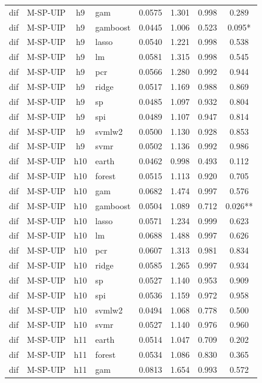 \begin{ThreePartTable}
\begin{longtable}[t]{llclcccc}
dif & M-SP-UIP & h9 & gam & 0.0575 & 1.301 & 0.998 & 0.289\\
dif & M-SP-UIP & h9 & gamboost & 0.0445 & 1.006 & 0.523 & 0.095*\\
dif & M-SP-UIP & h9 & lasso & 0.0540 & 1.221 & 0.998 & 0.538\\
dif & M-SP-UIP & h9 & lm & 0.0581 & 1.315 & 0.998 & 0.545\\
dif & M-SP-UIP & h9 & pcr & 0.0566 & 1.280 & 0.992 & 0.944\\
dif & M-SP-UIP & h9 & ridge & 0.0517 & 1.169 & 0.988 & 0.869\\
dif & M-SP-UIP & h9 & sp & 0.0485 & 1.097 & 0.932 & 0.804\\
dif & M-SP-UIP & h9 & spi & 0.0489 & 1.107 & 0.947 & 0.814\\
dif & M-SP-UIP & h9 & svmlw2 & 0.0500 & 1.130 & 0.928 & 0.853\\
dif & M-SP-UIP & h9 & svmr & 0.0502 & 1.136 & 0.992 & 0.986\\
\addlinespace
dif & M-SP-UIP & h10 & earth & 0.0462 & 0.998 & 0.493 & 0.112\\
dif & M-SP-UIP & h10 & forest & 0.0515 & 1.113 & 0.920 & 0.705\\
dif & M-SP-UIP & h10 & gam & 0.0682 & 1.474 & 0.997 & 0.576\\
dif & M-SP-UIP & h10 & gamboost & 0.0504 & 1.089 & 0.712 & 0.026**\\
dif & M-SP-UIP & h10 & lasso & 0.0571 & 1.234 & 0.999 & 0.623\\
dif & M-SP-UIP & h10 & lm & 0.0688 & 1.488 & 0.997 & 0.626\\
dif & M-SP-UIP & h10 & pcr & 0.0607 & 1.313 & 0.981 & 0.834\\
dif & M-SP-UIP & h10 & ridge & 0.0585 & 1.265 & 0.997 & 0.934\\
dif & M-SP-UIP & h10 & sp & 0.0527 & 1.140 & 0.953 & 0.909\\
dif & M-SP-UIP & h10 & spi & 0.0536 & 1.159 & 0.972 & 0.958\\
dif & M-SP-UIP & h10 & svmlw2 & 0.0494 & 1.068 & 0.778 & 0.500\\
dif & M-SP-UIP & h10 & svmr & 0.0527 & 1.140 & 0.976 & 0.960\\
\addlinespace
dif & M-SP-UIP & h11 & earth & 0.0514 & 1.047 & 0.709 & 0.202\\
dif & M-SP-UIP & h11 & forest & 0.0534 & 1.086 & 0.830 & 0.365\\
dif & M-SP-UIP & h11 & gam & 0.0813 & 1.654 & 0.993 & 0.572\\

\end{longtable}
\end{ThreePartTable}
